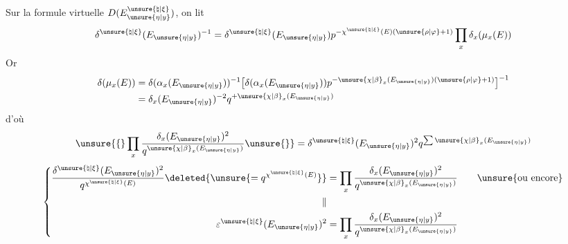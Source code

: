 Sur la formule virtuelle  $D(E_{\unsure{\eta|y}}^{\unsure{\natural|\xi}})$, on lit
\[
\delta^{\unsure{\natural|\xi}}(E_{\unsure{\eta|y}})^{-1}=\delta^{\unsure{\natural|\xi}}(E_{\unsure{\eta|y}})p^{-\chi^{\unsure{\natural|\xi}}(E)(\unsure{\rho|\varphi}+1)}\prod_x\delta_x(\mu_x(E))
\]
Or
\[
\begin{aligned}
\delta(\mu_x(E))&=\delta(\alpha_x(E_{\unsure{\eta|y}}))^{-1}\bigl[\delta(\alpha_x(E_{\unsure{\eta|y}}))p^{-\unsure{\chi|\beta}_x(E_{\unsure{\eta|y}})(\unsure{\rho|\varphi}+1)}\bigr]^{-1}\\
&=\delta_x(E_{\unsure{\eta|y}})^{-2}q^{+\unsure{\chi|\beta}_x(E_{\unsure{\eta|y}})}
\end{aligned}
\]
d'où
\[
\unsure{\{}\prod_x\frac{\delta_x(E_{\unsure{\eta|y}})^2}{q^{\unsure{\chi|\beta}_x(E_{\unsure{\eta|y}})}}\unsure{\}}=\delta^{\unsure{\natural|\xi}}(E_{\unsure{\eta|y}})^2q^{\sum\unsure{\chi|\beta}_x(E_{\unsure{\eta|y}})}
\]
\[
\left\{\begin{aligned}
\frac{\delta^{\unsure{\natural|\xi}}(E_{\unsure{\eta|y}})^2}{q^{\chi^{\unsure{\natural|\xi}}(E)}}\deleted{\unsure{=q^{\chi^{\unsure{\natural|\xi}}(E)}}}&=\prod_x\frac{\delta_x(E_{\unsure{\eta|y}})^2}{q^{\unsure{\chi|\beta}_x(E_{\unsure{\eta|y}})}}\qquad\text{\unsure{ou encore}}\\
\Vert&\\
\varepsilon^{\unsure{\natural|\xi}}(E_{\unsure{\eta|y}})^2&=\prod_x\frac{\delta_x(E_{\unsure{\eta|y}})^2}{q^{\unsure{\chi|\beta}_x(E_{\unsure{\eta|y}})}}
\end{aligned}\right.
\]


